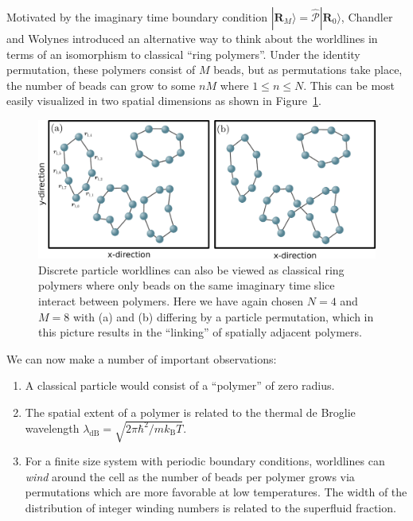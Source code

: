 \documentclass[prb,aps,amssym,nofootinbib,floatfix,notitlepage]{revtex4-1}
\renewcommand{\vec}[1]{\boldsymbol{#1}}
\newcommand{\R}{\vec{R}}
\begin{document}
Motivated by the imaginary time boundary condition $|\R_M\rangle =
\hat{\mathcal{P}}|\R_0\rangle$, Chandler and Wolynes \cite{Chandler:1981gz}
introduced an alternative way to think about the worldlines in terms of an
isomorphism to classical ``ring polymers''.  Under the identity permutation,
these polymers consist of $M$ beads, but as permutations take place, the number
of beads can grow to some $n M$ where $1 \le n \le N$. This can be most easily
visualized in two spatial dimensions as shown in Figure~\ref{fig:polymers}.
%
\begin{figure}
\begin{center}
\includegraphics[width=0.75\columnwidth]{Figures/polymers.pdf}
\end{center}
\caption{Discrete particle worldlines can also be viewed as classical ring
    polymers where only beads on the same imaginary time slice interact between
    polymers.  Here we have again chosen $N=4$ and $M=8$ with (a) and (b)
    differing by a particle permutation, which in this picture results in the
``linking'' of spatially adjacent polymers.}
\label{fig:polymers}
 \end{figure}
%
We can now make a number of important observations:
\begin{enumerate}
    \item A classical particle would consist of a ``polymer'' of zero radius.
    \item The spatial extent of a polymer is related to the thermal de Broglie
    wavelength $\lambda_{\mathrm{dB}} = \sqrt{2\pi \hbar^2 / m k_\mathrm{B} T
    }$.
\item For a finite size system with periodic boundary conditions, worldlines
    can \emph{wind} around the cell as the number of beads per polymer grows
    via permutations which are more favorable at low temperatures.  The width
    of the distribution of integer winding numbers is related to the superfluid
    fraction.
\end{enumerate}
\end{document}
